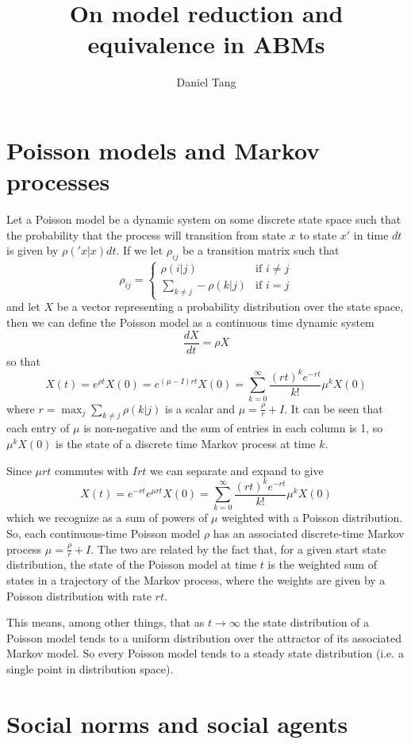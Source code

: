 \documentclass[a4paper]{article}
\title{On model reduction and equivalence in ABMs}
\author{Daniel Tang}
\begin{document}
\maketitle
\section{Poisson models and Markov processes}

Let a Poisson model be a dynamic system on some discrete state space such that the probability that the process will transition from state $x$ to state $x'$ in time $dt$ is given by $\rho('x|x)dt$. If we let $\rho_{ij}$ be a transition matrix such that
\[
\rho_{ij} = 
\begin{cases}
\rho(i|j) & \text{if } i \ne j\\
\sum_{k \ne j} -\rho(k|j) & \text{if } i = j
\end{cases}
\]
and let $X$ be a vector representing a probability distribution over the state space, then we can define the Poisson model as a continuous time dynamic system
\[
\frac{dX}{dt} = \rho X
\]
so that
\[
X(t) = e^{\rho t}X(0) = e^{(\mu - I)rt}X(0) = \sum_{k=0}^\infty \frac{ (rt)^k e^{-rt}}{k!}\mu^kX(0)
\]
where $r = \max_j \sum_{k \ne j} \rho(k|j)$ is a scalar and $\mu = \frac{\rho}{r} + I$. It can be seen that each entry of $\mu$ is non-negative and the sum of entries in each column is 1, so $\mu^k X(0)$ is the state of a discrete time Markov process at time $k$.

Since $\mu rt$ commutes with $Irt$ we can separate and expand to give
\[
X(t) = e^{-rt}e^{\mu rt}X(0) = \sum_{k=0}^\infty \frac{ (rt)^k e^{-rt}}{k!}\mu^kX(0)
\]
which we recognize as a sum of powers of $\mu$ weighted with a Poisson distribution. So, each continuous-time Poisson model $\rho$ has an associated discrete-time Markov process $\mu = \frac{\rho}{r} + I$. The two are related by the fact that, for a given start state distribution, the state of the Poisson model at time $t$ is the weighted sum of states in a trajectory of the Markov process, where the weights are given by a Poisson distribution with rate $rt$.

This means, among other things, that as $t \to \infty$ the state distribution of a Poisson model tends to a uniform distribution over the attractor of its associated Markov model. So every Poisson model tends to a steady state distribution (i.e. a single point in distribution space).

\section{Social norms and social agents}
\end{document}
